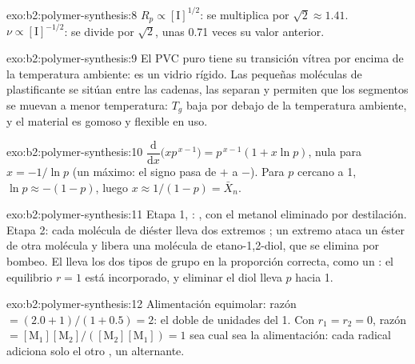 \begin{solution}{exo:b2:polymer-synthesis:8}
$R_p \propto [\mathrm I]^{1/2}$: se multiplica por $\sqrt2 \approx 1.41$. $\nu \propto [\mathrm I]^{-1/2}$:
se divide por $\sqrt 2$, unas 0.71 veces su valor anterior.
\end{solution}

\begin{solution}{exo:b2:polymer-synthesis:9}
El PVC puro tiene su transición vítrea por encima de la temperatura ambiente: es un vidrio rígido. Las pequeñas moléculas de
plastificante se sitúan entre las cadenas, las separan y permiten que los segmentos se muevan a menor temperatura: $T_g$ baja
por debajo de la temperatura ambiente, y el material es gomoso y flexible en uso.
\end{solution}

\begin{solution}{exo:b2:polymer-synthesis:10}
$\dfrac{\mathrm d}{\mathrm dx}\bigl(x p^{\,x-1}\bigr) = p^{\,x-1}(1 + x\ln p)$, nula para $x = -1/\ln p$
(un máximo: el signo pasa de $+$ a $-$). Para $p$ cercano a 1, $\ln p \approx -(1-p)$, luego $x \approx
1/(1-p) = \bar X_n$.
\end{solution}

\begin{solution}{exo:b2:polymer-synthesis:11}
Etapa 1, : , con el metanol
eliminado por destilación. Etapa 2: cada molécula de diéster lleva dos extremos ; un extremo ataca un éster
de otra molécula y libera una molécula de etano-1,2-diol, que se elimina por bombeo. El 
lleva los dos tipos de grupo en la proporción correcta, como un  : el equilibrio $r = 1$ está
incorporado, y eliminar el diol lleva $p$ hacia 1.
\end{solution}

\begin{solution}{exo:b2:polymer-synthesis:12}
Alimentación equimolar: razón $= (2.0 + 1)/(1 + 0.5) = 2$: el doble de unidades del  1. Con $r_1 = r_2 =
0$, razón $= [\mathrm M_1][\mathrm M_2]/([\mathrm M_2][\mathrm M_1]) = 1$ sea cual sea la alimentación: cada
radical adiciona solo el otro , un  alternante.
\end{solution}

